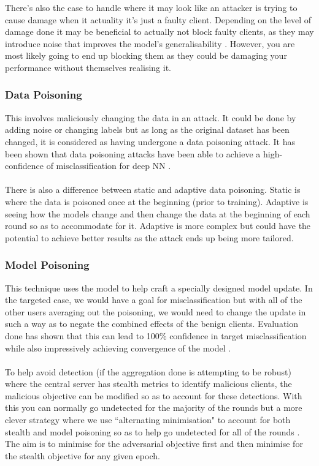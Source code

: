 There's also the case to handle where it may look like an attacker is trying to cause damage when it actuality it's just a faulty client. 
Depending on the level of damage done it may be beneficial to actually not block faulty clients, as they may introduce noise that improves the model's generalisability \cite{dnn_noise, robust_corrupt_noise}. 
However, you are most likely going to end up blocking them as they could be damaging your performance without themselves realising it.

\subsubsection{Data Poisoning}
This involves maliciously changing the data in an attack. 
It could be done by adding noise or changing labels but as long as the original dataset has been changed, it is considered as having undergone a data poisoning attack. 
It has been shown that data poisoning attacks have been able to achieve a high-confidence of misclassification for deep NN \cite{poison_dnn}. 
\\ \\
There is also a difference between static and adaptive data poisoning. 
Static is where the data is poisoned once at the beginning (prior to training). 
Adaptive is seeing how the models change and then change the data at the beginning of each round so as to accommodate for it. 
Adaptive is more complex but could have the potential to achieve better results as the attack ends up being more tailored.

\subsubsection{Model Poisoning}
This technique uses the model to help craft a specially designed model update. 
In the targeted case, we would have a goal for misclassification but with all of the other users averaging out the poisoning, we would need to change the update in such a way as to negate the combined effects of the benign clients.
Evaluation done has shown that this can lead to 100\% confidence in target misclassification while also impressively achieving convergence of the model \cite{adversarial_lens}. 
\\ \\
To help avoid detection (if the aggregation done is attempting to be robust) where the central server has stealth metrics to identify malicious clients, the malicious objective can be modified so as to account for these detections. 
With this you can normally go undetected for the majority of the rounds but a more clever strategy where we use ``alternating minimisation" to account for both stealth and model poisoning so as to help go undetected for all of the rounds \cite{adversarial_lens}. 
The aim is to minimise for the adversarial objective first and then minimise for the stealth objective for any given epoch.

